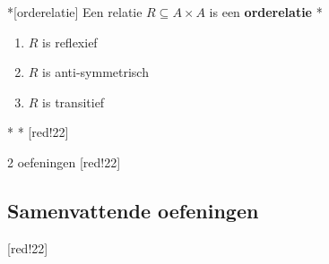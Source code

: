 \begin{nicedefinition}*[orderelatie]
    Een relatie $R \subseteq A \times A$ is een \textcolor{PineGreen!75!black}{\textbf{orderelatie}}
    \nextpart[asa]*
    \begin{enumerate}
        \item $R$ is reflexief
        \item $R$ is anti-symmetrisch
        \item $R$ is transitief
    \end{enumerate}
\end{nicedefinition}

\begin{niceexample}*
    \nextpart[Voorbeeld:]*
     [red!22]  
\end{niceexample}

2 oefeningen  [red!22]  

\subsection{Samenvattende oefeningen}

 [red!22]  

